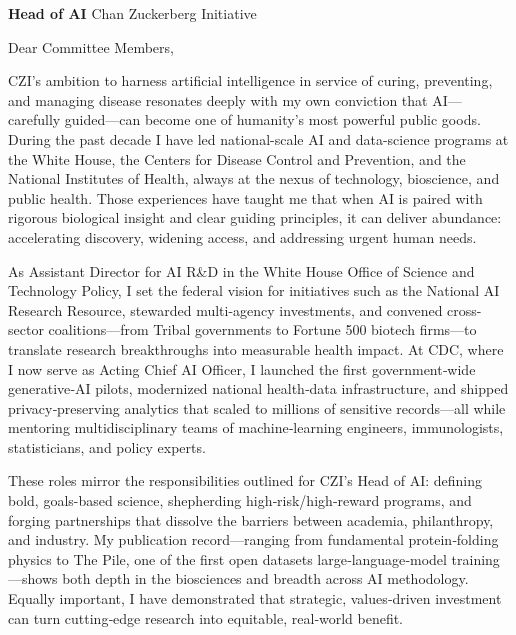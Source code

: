 \documentclass[]{scrartcl}
\begin{document}
\begin{cleanCV}

  \vspace{2em}
  \begin{raggedright}
    \textbf{Head of AI} \newline
    \hangindent=0.7cm \indent
    Chan Zuckerberg Initiative
  \end{raggedright}
  
  \vspace{2em}
  
  Dear Committee Members,

  \vspace{1em}
  \setlength{\parskip}{1em}


CZI’s ambition to harness artificial intelligence in service of curing, preventing, and managing disease resonates deeply with my own conviction that AI—carefully guided—can become one of humanity’s most powerful public goods. During the past decade I have led national-scale AI and data-science programs at the White House, the Centers for Disease Control and Prevention, and the National Institutes of Health, always at the nexus of technology, bioscience, and public health. Those experiences have taught me that when AI is paired with rigorous biological insight and clear guiding principles, it can deliver abundance: accelerating discovery, widening access, and addressing urgent human needs.

As Assistant Director for AI R\&D in the White House Office of Science and Technology Policy, I set the federal vision for initiatives such as the National AI Research Resource, stewarded multi-agency investments, and convened cross-sector coalitions—from Tribal governments to Fortune 500 biotech firms—to translate research breakthroughs into measurable health impact.
At CDC, where I now serve as Acting Chief AI Officer, I launched the first government‑wide generative‑AI pilots, modernized national health‑data infrastructure, and shipped privacy‑preserving analytics that scaled to millions of sensitive records—all while mentoring multidisciplinary teams of machine‑learning engineers, immunologists, statisticians, and policy experts.

These roles mirror the responsibilities outlined for CZI’s Head of AI: defining bold, goals-based science, shepherding high‑risk/high‑reward programs, and forging partnerships that dissolve the barriers between academia, philanthropy, and industry. My publication record—ranging from fundamental protein‑folding physics to The Pile, one of the first open datasets large‑language‑model training—shows both depth in the biosciences and breadth across AI methodology. Equally important, I have demonstrated that strategic, values‑driven investment can turn cutting‑edge research into equitable, real‑world benefit.


\end{cleanCV}
\end{document}
